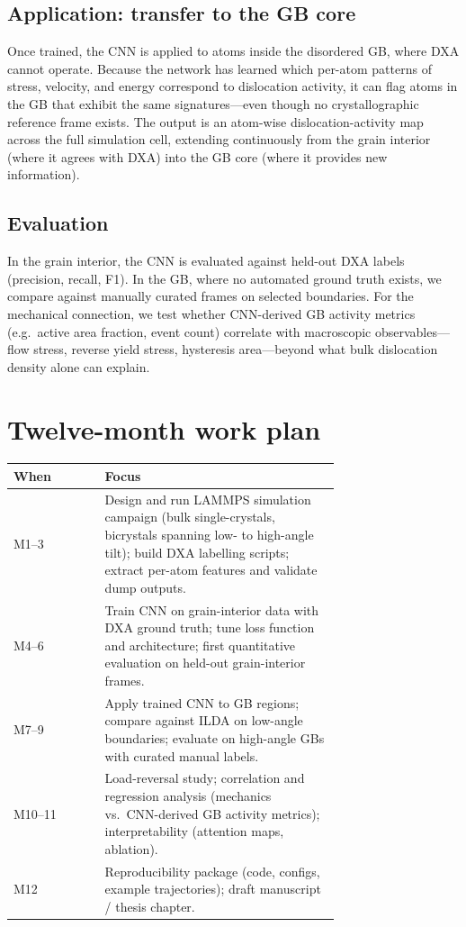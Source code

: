 \documentclass[11pt]{article}
\begin{document}
\subsection*{Application: transfer to the GB core}
Once trained, the CNN is applied to atoms inside the disordered GB, where DXA cannot operate.
Because the network has learned which per-atom patterns of stress, velocity, and energy correspond to dislocation activity, it can flag atoms in the GB that exhibit the same signatures---even though no crystallographic reference frame exists.
The output is an atom-wise dislocation-activity map across the full simulation cell, extending continuously from the grain interior (where it agrees with DXA) into the GB core (where it provides new information).

\subsection*{Evaluation}
In the grain interior, the CNN is evaluated against held-out DXA labels (precision, recall, F1).
In the GB, where no automated ground truth exists, we compare against manually curated frames on selected boundaries.
For the mechanical connection, we test whether CNN-derived GB activity metrics (e.g.\ active area fraction, event count) correlate with macroscopic observables---flow stress, reverse yield stress, hysteresis area---beyond what bulk dislocation density alone can explain.

\section*{Twelve-month work plan}
\begin{center}
\small
\begin{tabular}{|l|p{0.72\linewidth}|}
\hline
\textbf{When} & \textbf{Focus} \\
\hline
M1--3 & Design and run LAMMPS simulation campaign (bulk single-crystals, bicrystals spanning low- to high-angle tilt); build DXA labelling scripts; extract per-atom features and validate dump outputs. \\
 \hline
M4--6 & Train CNN on grain-interior data with DXA ground truth; tune loss function and architecture; first quantitative evaluation on held-out grain-interior frames. \\
 \hline
M7--9 & Apply trained CNN to GB regions; compare against ILDA on low-angle boundaries; evaluate on high-angle GBs with curated manual labels. \\
 \hline
M10--11 & Load-reversal study; correlation and regression analysis (mechanics vs.\ CNN-derived GB activity metrics); interpretability (attention maps, ablation). \\
 \hline
M12 & Reproducibility package (code, configs, example trajectories); draft manuscript / thesis chapter. \\
\hline
\end{tabular}
\end{center}
\end{document}
